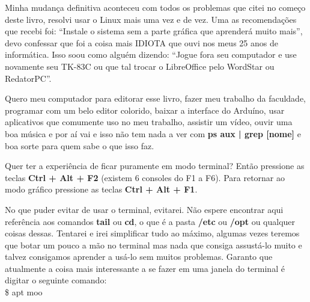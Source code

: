 Minha mudança definitiva aconteceu com todos os problemas que citei no começo deste livro, resolvi usar o Linux mais uma vez e de vez. Uma as recomendações que recebi foi: ``Instale o sistema sem a parte gráfica que aprenderá muito mais'', devo confessar que foi a coisa mais IDIOTA que ouvi nos meus 25 anos de informática. Isso soou como alguém dizendo: ``Jogue fora seu computador e use novamente seu TK-83C ou que tal trocar o LibreOffice pelo WordStar ou RedatorPC''.

Quero meu computador para editorar esse livro, fazer meu trabalho da faculdade, programar com um belo editor colorido, baixar a interface do Arduíno, usar aplicativos que comumente uso no meu trabalho, assistir um vídeo, ouvir uma boa música e por aí vai e isso não tem nada a ver com \textbf{ps aux | grep [nome]} e boa sorte para quem sabe o que isso faz.
\\[3mm]
\begin{dica} Quer ter a experiência de ficar puramente em modo terminal? Então pressione as teclas \textbf{Ctrl + Alt + F2} (existem 6 consoles do F1 a F6). Para retornar ao modo gráfico pressione as teclas \textbf{Ctrl + Alt + F1}.
\end{dica}

No que puder evitar de usar o terminal, evitarei. Não espere encontrar aqui referência aos comandos \textbf{tail} ou \textbf{cd}, o que é a pasta \textbf{/etc} ou \textbf{/opt} ou qualquer coisas dessas. Tentarei e irei simplificar tudo ao máximo, algumas vezes teremos que botar um pouco a mão no terminal mas nada que consiga assustá-lo muito e talvez consigamos aprender a usá-lo sem muitos problemas. Garanto que atualmente a coisa mais interessante a se fazer em uma janela do terminal é digitar o seguinte comando: \\
{\ttfamily\$ apt moo}

